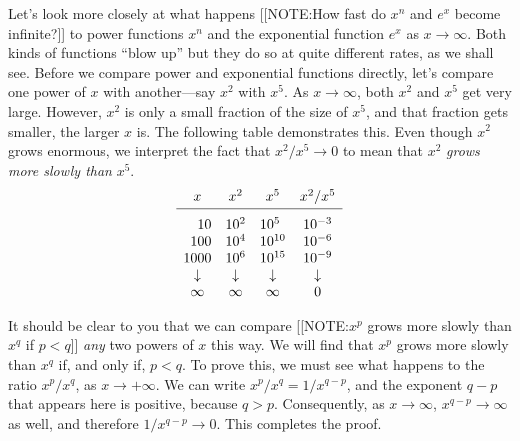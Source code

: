 Let's look more closely at what happens 
[[NOTE:How fast do $x^n$ and $e^x$ become infinite?]]
to power functions $x^n$ and the exponential function $e^x$ as $x \to
\infty$.  Both kinds of functions ``blow up'' but they do so at quite
different rates, as we shall see.  Before we compare power and
exponential functions directly, let's compare one power of $x$ with
another---say $x^2$ with $x^5$.  As $x \to \infty$, both $x^2$ and
$x^5$ get very large.  However, $x^2$ is only a small fraction of the
size of $x^5$, and that fraction gets smaller, the larger $x$ is.  The
following table demonstrates this.  Even though $x^2$ grows enormous,
we interpret the fact that $x^2/x^5 \to 0$ to mean that $x^2$ {\em
  grows more slowly than\/} $x^5$.  \addtolength{\arraycolsep}{14pt}
	\[
\begin{array}{cccc}
	x & x^2 & x^5 & x^2/x^5 \\[2pt] \hline
	\rule{0pt}{14pt} \hphantom{00}10 \rule{0pt}{14pt} &
		10^2 & 10^{5\hphantom{0}} & 10^{-3} \\
	\hphantom{0}100 & 10^4 & 10^{10} & 10^{-6} \\
	1000 & 10^6 & 10^{15} & 10^{-9} \\
	\downarrow & \downarrow & \downarrow & \downarrow \\
	\infty & \infty & \infty & 0 
	\end{array}
\]
	\addtolength{\arraycolsep}{-14pt}

It should be clear to you that we can compare 
[[NOTE:$x^p$ grows more slowly than $x^q$ if $p < q$]]
{\em any\/} two powers of $x$ this way.  We will find that $x^p$ grows
more slowly than $x^q$ if, and only if, $p < q$.  To prove this, we
must see what happens to the ratio $x^p/x^q$, as $x \to +\infty$.  We
can write $x^p/x^q = 1/x^{q - p}$, and the exponent $q - p$ that
appears here is positive, because $q > p$.  Consequently, as $x \to
\infty$, $x^{q-p} \to \infty$ as well, and therefore $1/x^{q-p} \to
0$.  This completes the proof.




